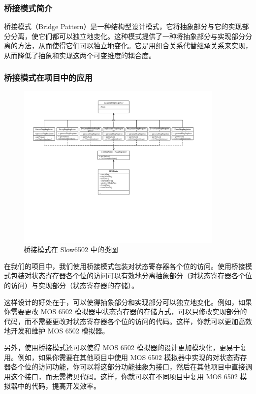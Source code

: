 \documentclass[cn,black,12pt,normal]{elegantnote}
\begin{document}
\subsubsection{桥接模式简介}

桥接模式（Bridge Pattern）是一种结构型设计模式，它将抽象部分与它的实现部分分离，使它们都可以独立地变化。这种模式提供了一种将抽象部分与实现部分分离的方法，从而使得它们可以独立地变化。它是用组合关系代替继承关系来实现，从而降低了抽象和实现这两个可变维度的耦合度。

\subsubsection{桥接模式在项目中的应用}

\begin{figure}[H]
  \centering
  \includegraphics[width=0.9\textwidth]{figures/Bridge.pdf}
  \caption{桥接模式在 Slow6502 中的类图}
\end{figure}

在我们的项目中，我们使用桥接模式包装对状态寄存器各个位的访问。使用桥接模式包装对状态寄存器各个位的访问可以有效地分离抽象部分（对状态寄存器各个位的访问）与实现部分（状态寄存器的存储）。

这样设计的好处在于，可以使得抽象部分和实现部分可以独立地变化。例如，如果你需要更改 MOS 6502 模拟器中状态寄存器的存储方式，可以只修改实现部分的代码，而不需要更改对状态寄存器各个位的访问的代码。这样，你就可以更加高效地开发和维护 MOS 6502 模拟器。

另外，使用桥接模式还可以使得 MOS 6502 模拟器的设计更加模块化，更易于复用。例如，如果你需要在其他项目中使用 MOS 6502 模拟器中实现的对状态寄存器各个位的访问功能，你可以将这部分功能抽象为接口，然后在其他项目中直接调用这个接口，而无需拷贝代码。这样，你就可以在不同项目中复用 MOS 6502 模拟器中的代码，提高开发效率。
\end{document}
